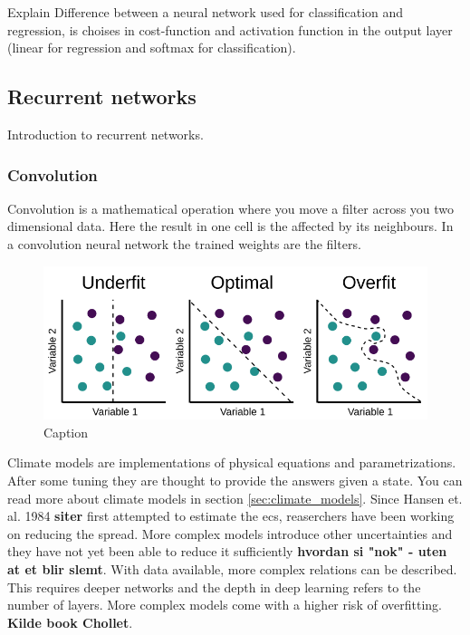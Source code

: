 Explain Difference between a neural network used for classification and regression, is choises in cost-function and activation function in the output layer (linear for regression and softmax for classification). 

\subsection{Recurrent networks}
Introduction to recurrent networks. 

\subsubsection{Convolution}
Convolution is a mathematical operation where you move a filter across you two dimensional data. Here the result in one cell is the affected by its neighbours. In a convolution neural network the trained weights are the filters. 






\begin{figure}
    \centering
    \includegraphics{Chapter2_Theory/images/classification_overfitted.png}
    \caption{Caption}
    \label{fig:classification_overfitting}
\end{figure}

Climate models are implementations of physical equations and parametrizations. After some tuning they are thought to provide the answers given a state. You can read more about climate models in section \ref{sec:climate_models}. Since Hansen et. al. 1984 \textbf{siter} first attempted to estimate the \acrfull{ecs}, reaserchers have been working on reducing the spread. 
More complex models introduce other uncertainties and they have not yet been able to reduce it sufficiently \textbf{hvordan si "nok" - uten at et blir slemt}. With data available, more complex relations can be described. This requires deeper networks and the depth in deep learning refers to the number of layers. More complex models come with a higher risk of overfitting. \textbf{Kilde book Chollet}.

